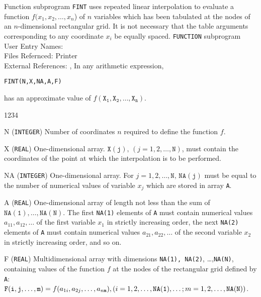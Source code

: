                   
            
           
              
Function subprogram {\tt FINT} uses repeated linear interpolation to
evaluate a
function $ f(x_1,x_2,\ldots,x_n$) of $n$ variables which has been
tabulated at the nodes of an $n$-dimensional rectangular grid. It is
not necessary that the table arguments corresponding to any
coordinate $ x_i$ be equally spaced.
\Structure
{\tt FUNCTION} subprogram \\
User Entry Names: \\
Files Refernced: Printer\\
External References: , 
\Usage
In any arithmetic expression,
\begin{center}
{\tt FINT(N,X,NA,A,F)}
\end{center}
has an approximate value of $f(\mathtt{X_1,X_2,\ldots,X_n})$.
\begin{DLtt}{1234}
\item [N] ({\tt INTEGER}) Number of coordinates $n$ required
to define the function $f$.
\item [X]({\tt REAL}) One-dimensional array.
$\mathtt{X(j)},\,(j=1,2,\ldots,\mathtt{N})$, must contain the coordinates
of the point at which the interpolation is to be performed.
\item [NA] ({\tt INTEGER}) One-dimensional array.
For $j=1,2,\ldots,\mathtt{N,\,NA(j)}$ must be equal to the number
of numerical values of variable $x_j$ which are stored in array {\tt A}.
\item [A]({\tt REAL}) One-dimensional array of length not less than
the sum of $\mathtt{NA(1),\ldots,NA(N)}$. The first {\tt NA(1)}
elements of {\tt A} must
contain numerical values $a_{11}, a_{12},\ldots$ of the first variable
$x_1$ in strictly increasing order, the next {\tt NA(2)} elements of
{\tt A} must contain numerical values $a_{21}, a_{22},\ldots$ of the
second variable $x_2$ in strictly increasing order, and so on.
\item [F]({\tt REAL}) Multidimensional array with dimensions {\tt NA(1),
NA(2)}, \ldots,{\tt NA(N)}, containing values of the function $f$ at the
nodes of the rectangular grid defined by {\tt A}:\\
$\mathtt{F(i,j,\ldots,m)} = f(a_{1{\tt i}},a_{2{\tt j}},\ldots,
a_{n\mathtt{m}}),(i=1,2,\ldots,\mathtt{NA(1)},\ldots;m=1,2,\ldots,
\mathtt{NA(N))}$.
\end{DLtt}
